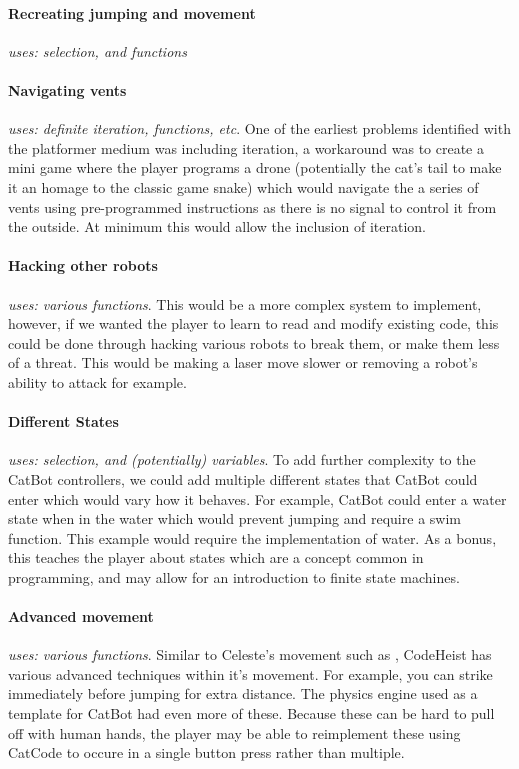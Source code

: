\paragraph{Recreating jumping and movement} \textit{uses: selection, and functions}

\paragraph{Navigating vents} \textit{uses: definite iteration, functions, etc}. One of the earliest problems identified with the platformer medium was including iteration, a workaround was to create a mini game where the player programs a drone (potentially the cat's tail to make it an homage to the classic game snake) which would navigate the a series of vents using pre-programmed instructions as there is no signal to control it from the outside. At minimum this would allow the inclusion of iteration.

\paragraph{Hacking other robots} \textit{uses: various functions}. This would be a more complex system to implement, however, if we wanted the player to learn to read and modify existing code, this could be done through hacking various robots to break them, or make them less of a threat. This would be making a laser move slower or removing a robot's ability to attack for example.

\paragraph{Different States} \textit{uses: selection, and (potentially) variables}. To add further complexity to the CatBot controllers, we could add multiple different states that CatBot could enter which would vary how it behaves. For example, CatBot could enter a water state when in the water which would prevent jumping and require a swim function. This example would require the implementation of water. As a bonus, this teaches the player about states which are a concept common in programming, and may allow for an introduction to finite state machines.

\paragraph{Advanced movement} \textit{uses: various functions}. Similar to Celeste's movement  such as  \citep{celesteTech}, CodeHeist has various advanced techniques within it's movement. For example, you can strike immediately before jumping for extra distance. The physics engine used as a template for CatBot had even more of these. Because these can be hard to pull off with human hands, the player may be able to reimplement these using CatCode to occure in a single button press rather than multiple.

